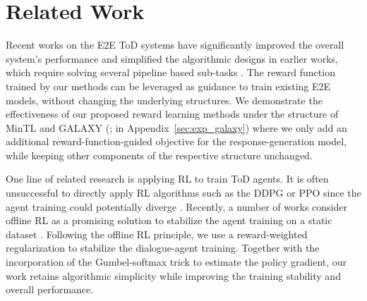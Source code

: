 \vspace{-.8em}
\section{Related Work}
\vspace{-.8em}
Recent works on the E2E ToD systems \citep[\eg,][]{wu2019alternating,mintl2020,simpletod2020,ham2020end,soloist2021,ubar2021} have significantly improved the overall system's performance
and simplified the algorithmic designs in earlier works, which require solving several pipeline based sub-tasks \citep[\eg,][]{young2013pomdp,gao2018neural,damd2020}.
The reward function trained by our methods can be leveraged as guidance to train existing E2E models, without changing the underlying structures. 
We demonstrate the effectiveness of our proposed reward learning methods under the structure of MinTL \citep{mintl2020} and GALAXY (\citet{he2022galaxy}; in Appendix~\ref{sec:exp_galaxy})
where we only add an additional reward-function-guided objective for the response-generation model, while keeping other components of the respective structure unchanged. 

One line of related research is applying RL to train ToD agents.
It is often unsuccessful to directly apply RL algorithms such as the DDPG \citep{lillicrap2015continuous} or PPO \citep{schulman2017proximal} since the agent training could potentially diverge \citep{zhao2019rethinking,gptcritic2022,kwan2022survey}.
Recently, a number of works consider offline RL \citep{offlinetutorial2020} as a promising solution to stabilize the agent training on a static dataset \citep[\eg,][]{jaques2020human,caspi2021,gptcritic2022,verma2022chai,snell2022offline,snell2022context}.
Following the offline RL principle, we use a reward-weighted regularization to stabilize the dialogue-agent training. 
Together with the incorporation of the Gumbel-softmax trick to estimate the policy gradient, 
our work retains algorithmic simplicity while improving the training stability and overall performance. 

